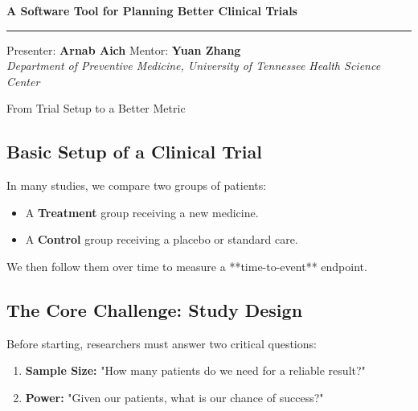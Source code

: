 \documentclass[a0,landscape]{a0poster}
\begin{document}
\pagestyle{empty}

\begin{center}
    \veryHuge \textbf{A Software Tool for Planning Better Clinical Trials} \\
    \vspace{0.25cm}
    \rule{\linewidth}{1.5pt}
    \vspace{0.25cm}
    \Huge Presenter: \textbf{Arnab Aich} \hspace{1cm} Mentor: \textbf{Yuan Zhang}\\
    \huge \textit{Department of Preventive Medicine, University of Tennessee Health Science Center}
\end{center}
\vspace{0.5cm}

\begin{minipage}[t][\dimexpr\textheight-1cm\relax][t]{0.32\linewidth} %

\begin{posterbox}{From Trial Setup to a Better Metric}
    \subsection*{\Large Basic Setup of a Clinical Trial}
    \Large
    In many studies, we compare two groups of patients:
    \begin{itemize} \itemsep=0.5em
        \item A \textbf{Treatment} group receiving a new medicine.
        \item A \textbf{Control} group receiving a placebo or standard care.
    \end{itemize}
    We then follow them over time to measure a **time-to-event** endpoint.

    \subsection*{\Large The Core Challenge: Study Design}
    \Large
    Before starting, researchers must answer two critical questions:
    \begin{enumerate} \itemsep=0.5em
        \item \textbf{Sample Size:} "How many patients do we need for a reliable result?"
        \item \textbf{Power:} "Given our patients, what is our chance of success?"
    \end{enumerate}
    

\end{posterbox}
\end{minipage}
\end{document}
